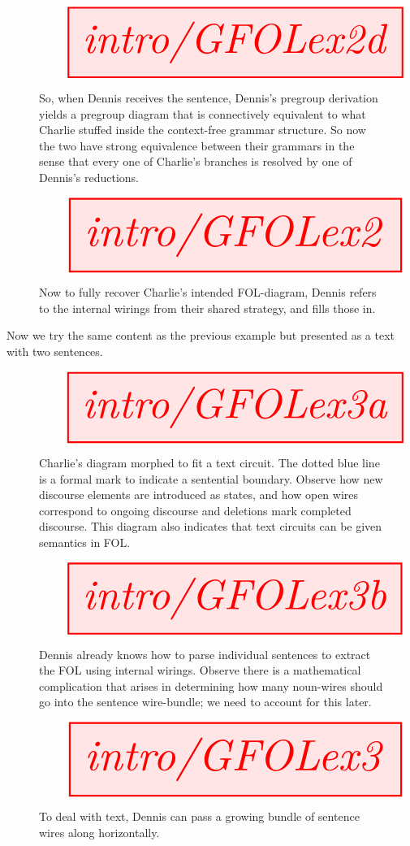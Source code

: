 \begin{example}
\begin{figure}[h!]\label{fig:GFOLex2d}
\centering
\[\resizebox{\textwidth}{!}{\tikzfig{intro/GFOLex2d}}\]
\caption{So, when Dennis receives the sentence, Dennis's pregroup derivation yields a pregroup diagram that is connectively equivalent to what Charlie stuffed inside the context-free grammar structure. So now the two have strong equivalence between their grammars in the sense that every one of Charlie's branches is resolved by one of Dennis's reductions.}
\end{figure}

\begin{figure}[h!]\label{fig:GFOLex2}
\centering
\[\resizebox{\textwidth}{!}{\tikzfig{intro/GFOLex2}}\]
\caption{Now to fully recover Charlie's intended FOL-diagram, Dennis refers to the internal wirings from their shared strategy, and fills those in.}
\end{figure}
\end{example}
\clearpage

\begin{example} Now we try the same content as the previous example but presented as a text with two sentences.
\begin{figure}[h!]\label{fig:GFOLex3a}
\centering
\[\resizebox{\textwidth}{!}{\tikzfig{intro/GFOLex3a}}\]
\caption{Charlie's diagram morphed to fit a text circuit. The dotted blue line is a formal mark to indicate a sentential boundary. Observe how new discourse elements are introduced as states, and how open wires correspond to ongoing discourse and deletions mark completed discourse. This diagram also indicates that text circuits can be given semantics in FOL.}
\end{figure}

\begin{figure}[h!]\label{fig:GFOLex3a}
\centering
\[\resizebox{\textwidth}{!}{\tikzfig{intro/GFOLex3b}}\]
\caption{Dennis already knows how to parse individual sentences to extract the FOL using internal wirings. Observe there is a mathematical complication that arises in determining how many noun-wires should go into the sentence wire-bundle; we need to account for this later.}
\end{figure}

\begin{figure}[h!]\label{fig:GFOLex3a}
\centering
\[\resizebox{\textwidth}{!}{\tikzfig{intro/GFOLex3}}\]
\caption{To deal with text, Dennis can pass a growing bundle of sentence wires along horizontally.}
\end{figure}
\end{example}

